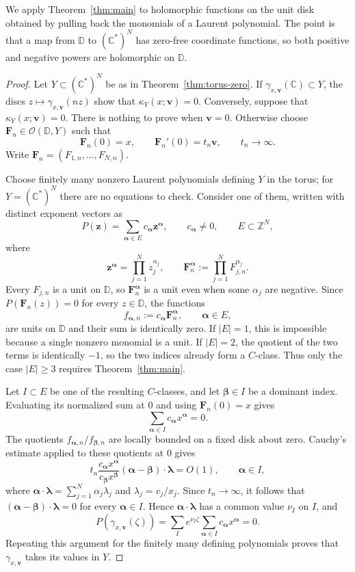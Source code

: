 \documentclass[12pt,letterpaper,reqno]{amsart}
\theoremstyle{definition}
\numberwithin{equation}{section}
\newcommand{\D}{\mathbb D}
\newcommand{\C}{\mathbb C}
\newcommand{\OO}{\mathcal O}
\begin{document}
	We apply Theorem~\ref{thm:main} to holomorphic functions on the unit
	disk obtained by pulling back the monomials of a Laurent polynomial.
	The point is that a map from $\D$ to $(\C^*)^N$ has zero-free
	coordinate functions, so both positive and negative powers are
	holomorphic on $\D$.
	
	\begin{proof}
		Let $Y\subset(\C^*)^N$ be as in Theorem~\ref{thm:torus-zero}.
		If $\gamma_{x,\bm{v}}(\C)\subset Y$, the discs
		$z\mapsto\gamma_{x,\bm{v}}(nz)$ show that $\kappa_Y(x;\bm{v})=0$.
		Conversely, suppose that $\kappa_Y(x;\bm{v})=0$. There is nothing to prove
		when $\bm{v}=0$. Otherwise choose $\bm F_n\in\OO(\D,Y)$ such that
		\[
		\bm F_n(0)=x,\qquad \bm F_n'(0)=t_n\bm{v},\qquad t_n\to\infty.
		\]
		Write $\bm F_n=(F_{1,n},\ldots,F_{N,n})$.
		
		Choose finitely many nonzero Laurent polynomials defining $Y$ in the
		torus; for $Y=(\C^*)^N$ there are no equations to check. Consider one
		of them, written with distinct exponent vectors as
		\[
		P(\bm{z})=\sum_{\bm{\alpha}\in E}c_{\bm{\alpha}}\bm{z}^{\bm{\alpha}},
		\qquad c_{\bm{\alpha}}\ne0,\qquad E\subset\mathbb Z^N,
		\]
		where
		\[
		\bm{z}^{\bm{\alpha}}=\prod_{j=1}^Nz_j^{\alpha_j},\qquad
		\bm F_n^{\bm{\alpha}}:=\prod_{j=1}^NF_{j,n}^{\alpha_j}.
		\]
		Every $F_{j,n}$ is a unit on $\D$, so $\bm F_n^{\bm{\alpha}}$ is a
		unit even when some $\alpha_j$ are negative. Since
		$P(\bm F_n(z))=0$ for every $z\in\D$, the functions
		\[
		f_{\bm{\alpha},n}:=c_{\bm{\alpha}}\bm F_n^{\bm{\alpha}},
		\qquad \bm{\alpha}\in E,
		\]
		are units on $\D$ and their sum is identically zero.
		If $|E|=1$, this is impossible because a single nonzero monomial is a
		unit. If $|E|=2$, the quotient of the two terms is identically $-1$,
		so the two indices already form a $C$-class. Thus only the case
		$|E|\ge3$ requires Theorem~\ref{thm:main}.
		
		Let $I\subset E$ be one of the resulting $C$-classes, and let
		$\bm{\beta}\in I$ be a dominant index. Evaluating its normalized sum at
		$0$ and using $\bm F_n(0)=x$ gives
		\[
		\sum_{\bm{\alpha}\in I}c_{\bm{\alpha}}x^{\bm{\alpha}}=0.
		\]
		The quotients $f_{\bm{\alpha},n}/f_{\bm{\beta},n}$ are locally bounded
		on a fixed disk about zero. Cauchy's estimate applied to these quotients
		at $0$ gives
		\[
		t_n\frac{c_{\bm{\alpha}}x^{\bm{\alpha}}}
		{c_{\bm{\beta}}x^{\bm{\beta}}}
		(\bm{\alpha}-\bm{\beta})\cdot\bm{\lambda}=O(1),
		\qquad \bm{\alpha}\in I,
		\]
		where $\bm{\alpha}\cdot\bm{\lambda}=\sum_{j=1}^N\alpha_j\lambda_j$ and
		$\lambda_j=v_j/x_j$. Since $t_n\to\infty$, it follows that
		$(\bm{\alpha}-\bm{\beta})\cdot\bm{\lambda}=0$ for every
		$\bm{\alpha}\in I$. Hence $\bm{\alpha}\cdot\bm{\lambda}$ has a common
		value $\nu_I$ on $I$, and
		\[
		P(\gamma_{x,\bm{v}}(\zeta))
		=\sum_I e^{\nu_I\zeta}
		\sum_{\bm{\alpha}\in I}c_{\bm{\alpha}}x^{\bm{\alpha}}=0.
		\]
		Repeating this argument for the finitely many defining polynomials
		proves that $\gamma_{x,\bm{v}}$ takes its values in $Y$.
	\end{proof}
\end{document}
